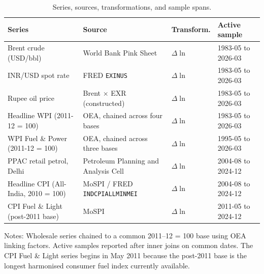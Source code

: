 \begin{table}[t]
\centering
\caption{Series, sources, transformations, and sample spans.}
\label{tab:data}
\footnotesize
\setlength{\tabcolsep}{4pt}
\begin{threeparttable}
\begin{tabular}{p{3.4cm} p{4.4cm} p{1.6cm} p{3.0cm}}
\toprule
Series & Source & Transform. & Active sample \\
\midrule
Brent crude (USD/bbl) & World Bank Pink Sheet & $\Delta \ln$ & 1983-05 to 2026-03 \\
INR/USD spot rate & FRED \texttt{EXINUS} & $\Delta \ln$ & 1983-05 to 2026-03 \\
Rupee oil price & Brent $\times$ EXR (constructed) & $\Delta \ln$ & 1983-05 to 2026-03 \\
Headline WPI (2011-12 = 100) & OEA, chained across four bases & $\Delta \ln$ & 1983-05 to 2026-03 \\
WPI Fuel \& Power (2011-12 = 100) & OEA, chained across three bases & $\Delta \ln$ & 1995-05 to 2026-03 \\
PPAC retail petrol, Delhi & Petroleum Planning and Analysis Cell & $\Delta \ln$ & 2004-08 to 2024-12 \\
Headline CPI (All-India, 2010 = 100) & MoSPI / FRED \texttt{INDCPIALLMINMEI} & $\Delta \ln$ & 2004-08 to 2024-12 \\
CPI Fuel \& Light (post-2011 base) & MoSPI & $\Delta \ln$ & 2011-05 to 2024-12 \\
\bottomrule
\end{tabular}
\begin{tablenotes}\footnotesize
\item Notes: Wholesale series chained to a common 2011--12 = 100 base using OEA linking factors. Active samples reported after inner joins on common dates. The CPI Fuel \& Light series begins in May 2011 because the post-2011 base is the longest harmonised consumer fuel index currently available.
\end{tablenotes}
\end{threeparttable}
\end{table}
